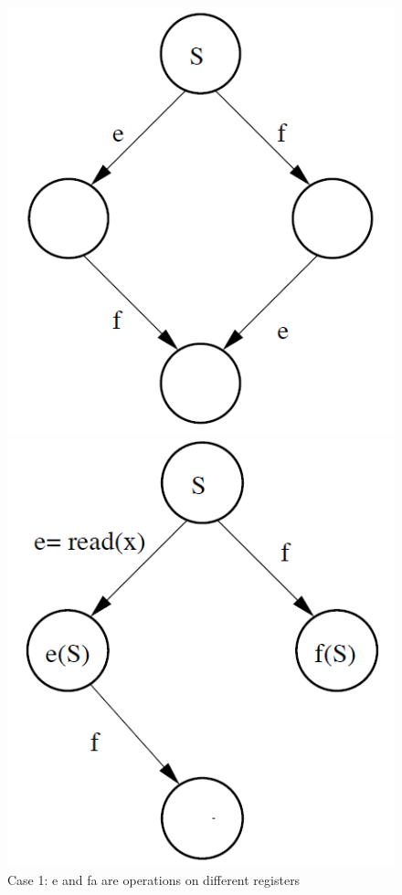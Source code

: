 \documentclass[twoside]{article}
\begin{document}
\begin{figure}[H]
    \begin{minipage}{.3\textwidth}\centering
    \includegraphics[scale=0.3]{case1.png}
    \caption{Case 1: e and fa are operations on different registers}
    \end{minipage}    
    \begin{minipage}{.3\textwidth}\centering
        \includegraphics[scale=0.3]{case2.png}

\end{minipage}
\end{figure}
\end{document}
